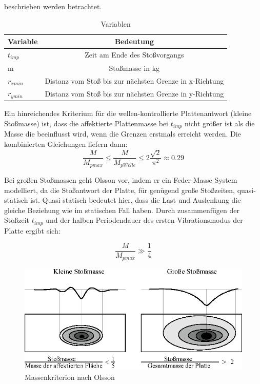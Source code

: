 beschrieben werden betrachtet. 

\begin{table}[h!]
	\begin{center}
		\caption{Variablen}
		\label{tab:Tabelle 2}
		\begin{tabular}{l|c}
			\textbf{Variable} & \textbf{Bedeutung}\\
			\hline
			$t_{imp}$ & Zeit am Ende des Stoßvorgangs\\
			m & Stoßmasse in kg\\
			$r_{xmin}$ & Distanz vom Stoß bis zur nächsten Grenze in x-Richtung\\
			$r_{ymin}$ & Distanz vom Stoß bis zur nächsten Grenze in y-Richtung\\
		\end{tabular}
	\end{center}
\end{table}

Ein hinreichendes Kriterium für die wellen-kontrollierte Plattenantwort (kleine Stoßmasse) ist, dass die affektierte Plattenmasse bei $t_{imp}$ nicht größer ist als die Masse die beeinflusst wird, wenn die Grenzen erstmals erreicht werden. Die kombinierten Gleichungen liefern dann: 
\begin{equation}
	\frac{M}{M_{pmax}} \leq \frac{M}{M_{pWelle}} \leq 2 \frac{\sqrt{2}}{\pi^{2}} \approx 0.29
\end{equation}

Bei großen Stoßmassen geht Olsson vor, indem er ein Feder-Masse System modelliert, da die Stoßantwort der Platte, für genügend große Stoßzeiten, quasi-statisch ist. Quasi-statisch bedeutet hier, dass die Last und Auslenkung die gleiche Beziehung wie im statischen Fall haben. Durch zusammenfügen der Stoßzeit $t_{imp}$ und der halben Periodendauer des ersten Vibrationsmodus der Platte ergibt sich: 

\begin{equation}
	\frac{M}{M_{pmax}} \gg \frac{1}{4}
\end{equation}

\begin{figure}[h!]
	\includegraphics[width=\linewidth]{pictures/einleitung/MassenkriterionOlsson.eps}
	\caption{Massenkriterion nach Olsson}	
	\label{fig:Olsson}
\end{figure}


